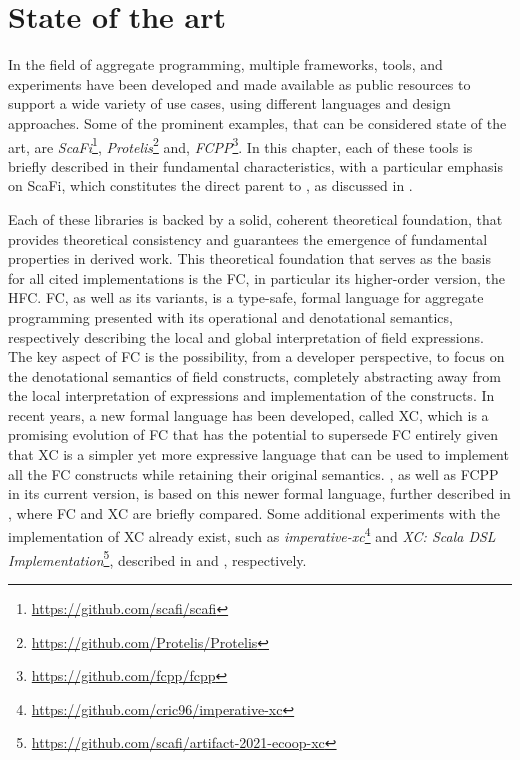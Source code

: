 \chapter{State of the art}
\label{chap:state-of-the-art}

In the field of aggregate programming\cite{aggregate-programming}, multiple frameworks, tools, and experiments have been developed and made available as public resources to support a wide variety of use cases, using different languages and design approaches.
%
Some of the prominent examples, that can be considered state of the art, are \textit{ScaFi}\footnote{\url{https://github.com/scafi/scafi}}\cite{scafi}, \textit{Protelis}\footnote{\url{https://github.com/Protelis/Protelis}}\cite{protelis} and, \textit{FCPP}\footnote{\url{https://github.com/fcpp/fcpp}}\cite{fcpp}.
%
In this chapter, each of these tools is briefly described in their fundamental characteristics, with a particular emphasis on ScaFi, which constitutes the direct parent to \this, as discussed in .

Each of these libraries is backed by a solid, coherent theoretical foundation, that provides theoretical consistency and guarantees the emergence of fundamental properties in derived work.
%
This theoretical foundation that serves as the basis for all cited implementations is the \ac{FC}\cite{fc}, in particular its higher-order version, the \ac{HFC}\cite{hofc}.
%
\ac{FC}, as well as its variants, is a type-safe, formal language for aggregate programming\cite{fc, from-dc-to-fc-and-ap} presented with its operational and denotational semantics, respectively describing the local and global interpretation of field expressions\cite{from-dc-to-fc-and-ap}.
%
The key aspect of \ac{FC} is the possibility, from a developer perspective, to focus on the denotational semantics of field constructs, completely abstracting away from the local interpretation of expressions and implementation of the constructs.
%
In recent years, a new formal language has been developed, called \ac{XC}\cite{xc}, which is a promising evolution of \ac{FC} that has the potential to supersede \ac{FC} entirely given that \ac{XC} is a simpler yet more expressive language that can be used to implement all the \ac{FC} constructs while retaining their original semantics.
%
\this, as well as FCPP in its current version, is based on this newer formal language, further described in , where \ac{FC} and \ac{XC} are briefly compared.
%
Some additional experiments with the implementation of \ac{XC} already exist, such as \textit{imperative-xc}\footnote{\url{https://github.com/cric96/imperative-xc}} and \textit{XC: Scala DSL Implementation}\footnote{\url{https://github.com/scafi/artifact-2021-ecoop-xc}}\cite{xc-experiment-with-scafi}, described in  and , respectively.

